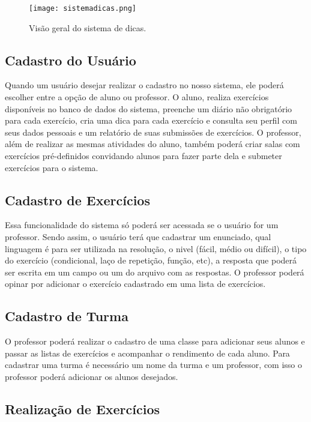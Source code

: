 \begin{figure}[h]
	\captionsetup{justification=centering}
	\texttt{[image: sistemadicas.png]}
	\caption{Visão geral do sistema de dicas.}
	\label{figura:sistemadicas}
\end{figure}

\subsection{Cadastro do Usuário}

Quando um usuário desejar realizar o cadastro no nosso sistema, ele poderá escolher entre a opção de aluno ou professor. O aluno, realiza exercícios disponíveis no banco de dados do sistema, preenche um diário não obrigatório para cada exercício, cria uma dica para cada exercício e consulta seu perfil com seus dados pessoais e um relatório de suas submissões de exercícios. O professor, além de realizar as mesmas atividades do aluno, também poderá criar salas com exercícios pré-definidos convidando alunos para fazer parte dela e submeter exercícios para o sistema.

\subsection{Cadastro de Exercícios}

Essa funcionalidade do sistema só poderá ser acessada se o usuário for um professor. Sendo assim, o usuário terá que cadastrar um enunciado, qual linguagem é para ser utilizada na resolução, o nivel (fácil, médio ou difícil), o tipo do exercício (condicional, laço de repetição, função, etc), a resposta que poderá ser escrita em um campo ou um  do arquivo com as respostas. O professor poderá opinar por adicionar o exercício cadastrado em uma lista de exercícios. 

\subsection{Cadastro de Turma}

O professor poderá realizar o cadastro de uma classe para adicionar seus alunos e passar as listas de exercícios e acompanhar o rendimento de cada aluno. Para cadastrar uma turma é necessário um nome da turma e um professor, com isso o professor poderá adicionar os alunos desejados.




\subsection{Realização de Exercícios}

